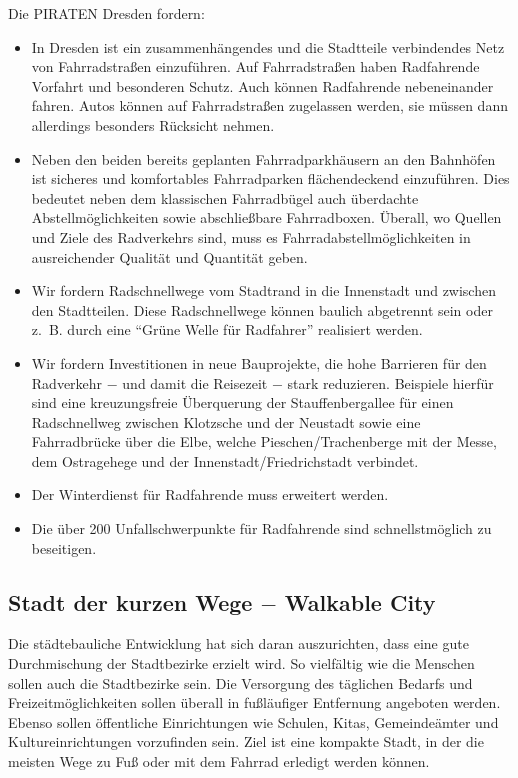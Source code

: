 \documentclass[a4paper, 11pt]{article}
\begin{document}
Die PIRATEN Dresden fordern:
\begin{itemize}
    \item In Dresden ist ein zusammenhängendes und die Stadtteile verbindendes Netz von Fahrradstraßen einzuführen. Auf Fahrradstraßen haben Radfahrende Vorfahrt und besonderen Schutz. Auch können Radfahrende nebeneinander fahren. Autos können auf Fahrradstraßen zugelassen werden, sie müssen dann allerdings besonders Rücksicht nehmen.

    \item  Neben den beiden bereits geplanten Fahrradparkhäusern an den Bahnhöfen ist sicheres und komfortables Fahrradparken flächendeckend einzuführen. Dies bedeutet neben dem klassischen Fahrradbügel auch überdachte Abstellmöglichkeiten sowie abschließbare Fahrradboxen. Überall, wo Quellen und Ziele des Radverkehrs sind, muss es Fahrradabstellmöglichkeiten in ausreichender Qualität und Quantität geben.

    \item  Wir fordern Radschnellwege vom Stadtrand in die Innenstadt und zwischen den Stadtteilen. Diese Radschnellwege können baulich abgetrennt sein oder z. B. durch eine ``Grüne Welle für Radfahrer'' realisiert werden.

    \item  Wir fordern Investitionen in neue Bauprojekte, die hohe Barrieren für den Radverkehr $-$ und damit die Reisezeit $-$ stark reduzieren. Beispiele hierfür sind eine kreuzungsfreie Überquerung der Stauffenbergallee für einen Radschnellweg zwischen Klotzsche und der Neustadt sowie eine Fahrradbrücke über die Elbe, welche Pieschen/Trachenberge mit der Messe, dem Ostragehege und der Innenstadt/Friedrichstadt verbindet.

    \item  Der Winterdienst für Radfahrende muss erweitert werden.

    \item Die über 200 Unfallschwerpunkte für Radfahrende sind schnellstmöglich zu beseitigen.
\end{itemize}


\subsection{Stadt der kurzen Wege $-$ Walkable City}
Die städtebauliche Entwicklung hat sich daran auszurichten, dass eine gute Durchmischung der Stadtbezirke erzielt wird. So vielfältig wie die Menschen sollen auch die Stadtbezirke sein. Die Versorgung des täglichen Bedarfs und Freizeitmöglichkeiten sollen überall in fußläufiger Entfernung angeboten werden. Ebenso sollen öffentliche Einrichtungen wie Schulen, Kitas, Gemeindeämter und Kultureinrichtungen vorzufinden sein. Ziel ist eine kompakte Stadt, in der die meisten Wege zu Fuß oder mit dem Fahrrad erledigt werden können.\newline
\end{document}
